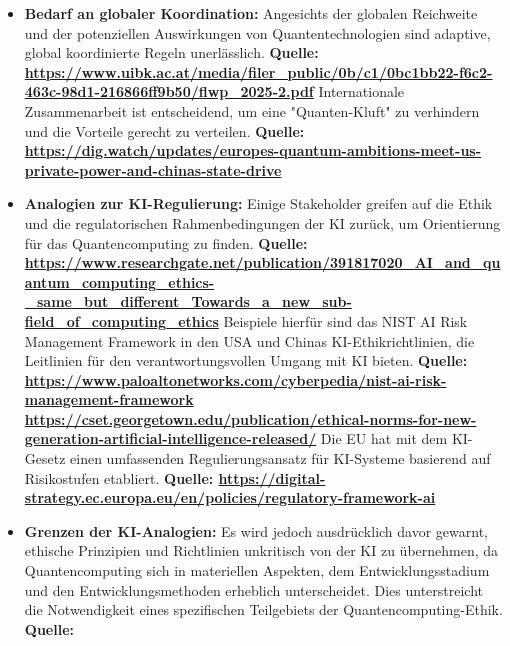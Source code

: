 \begin{itemize}
    \item \textbf{Bedarf an globaler Koordination:} Angesichts der globalen Reichweite und der potenziellen Auswirkungen von Quantentechnologien sind adaptive, global koordinierte Regeln unerlässlich. \textbf{Quelle: \href{https://www.uibk.ac.at/media/filer_public/0b/c1/0bc1bb22-f6c2-463c-98d1-216866ff9b50/flwp_2025-2.pdf}{https://www.uibk.ac.at/media/filer\_public/0b/c1/0bc1bb22-f6c2-463c-98d1-216866ff9b50/flwp\_2025-2.pdf}} Internationale Zusammenarbeit ist entscheidend, um eine "Quanten-Kluft" zu verhindern und die Vorteile gerecht zu verteilen. \textbf{Quelle: \href{https://dig.watch/updates/europes-quantum-ambitions-meet-us-private-power-and-chinas-state-drive}{https://dig.watch/updates/europes-quantum-ambitions-meet-us-private-power-and-chinas-state-drive}}
    \item \textbf{Analogien zur KI-Regulierung:} Einige Stakeholder greifen auf die Ethik und die regulatorischen Rahmenbedingungen der KI zurück, um Orientierung für das Quantencomputing zu finden. \textbf{Quelle: \href{https://www.researchgate.net/publication/391817020_AI_and_quantum_computing_ethics-_same_but_different_Towards_a_new_sub-field_of_computing_ethics}{https://www.researchgate.net/publication/391817020\_AI\_and\_quantum\_computing\_ethics-\_same\_but\_different\_Towards\_a\_new\_sub-field\_of\_computing\_ethics}} Beispiele hierfür sind das NIST AI Risk Management Framework in den USA und Chinas KI-Ethikrichtlinien, die Leitlinien für den verantwortungsvollen Umgang mit KI bieten. \textbf{Quelle: \href{https://www.paloaltonetworks.com/cyberpedia/nist-ai-risk-management-framework}{https://www.paloaltonetworks.com/cyberpedia/nist-ai-risk-management-framework}} \textbf{\href{https://cset.georgetown.edu/publication/ethical-norms-for-new-generation-artificial-intelligence-released/}{https://cset.georgetown.edu/publication/ethical-norms-for-new-generation-artificial-intelligence-released/}} Die EU hat mit dem KI-Gesetz einen umfassenden Regulierungsansatz für KI-Systeme basierend auf Risikostufen etabliert. \textbf{Quelle: 
\href{https://digital-strategy.ec.europa.eu/en/policies/regulatory-framework-ai}{https://digital-strategy.ec.europa.eu/en/policies/regulatory-framework-ai}
}
    \item \textbf{Grenzen der KI-Analogien:} Es wird jedoch ausdrücklich davor gewarnt, ethische Prinzipien und Richtlinien unkritisch von der KI zu übernehmen, da Quantencomputing sich in materiellen Aspekten, dem Entwicklungsstadium und den Entwicklungsmethoden erheblich unterscheidet. Dies unterstreicht die Notwendigkeit eines spezifischen Teilgebiets der Quantencomputing-Ethik. \textbf{Quelle: 
}
\end{itemize}
